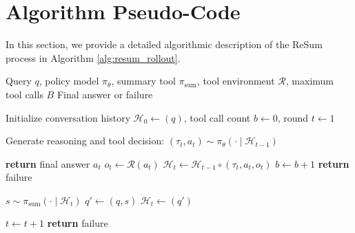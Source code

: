 \clearpage
\newpage
\section{Algorithm Pseudo-Code}

In this section, we provide a detailed algorithmic description of the ReSum process in Algorithm \ref{alg:resum_rollout}.

\renewcommand{\algorithmiccomment}[1]{\hfill $\triangleright$ {#1}}

\begin{algorithm}[h]
   \caption{\textbf{ReSum Rollout with Periodic Context Summarization}}
   \label{alg:resum_rollout}
\begin{algorithmic}[1]
    Query $q$, policy model $\pi_{\theta}$, summary tool $\pi_{\text{sum}}$, tool environment $\mathcal{R}$, maximum tool calls $B$
    Final answer or failure
   
   \STATE %
   \STATE Initialize conversation history $\mathcal{H}_0 \gets (q)$, tool call count $b \gets 0$, round $t \gets 1$
   
      \STATE Generate reasoning and tool decision:
      \STATE $(\tau_t, a_t) \sim \pi_{\theta}(\cdot \mid \mathcal{H}_{t-1})$ 
      
         \STATE \textbf{return} final answer $a_t$
         \STATE $o_t \gets \mathcal{R}(a_t)$ \COMMENT{\lightresponse{}}
         \STATE $\mathcal{H}_{t} \gets \mathcal{H}_{t-1} \circ (\tau_t, a_t, o_t)$
         \STATE $b \gets b+1$
      \ELSE
         \STATE \textbf{return} failure 
      \ENDIF
      
      \STATE %
         \STATE $s \sim \pi_{\text{sum}}(\cdot \mid \mathcal{H}_t)$ 
         \STATE $q' \gets (q, s)$
         \STATE $\mathcal{H}_t \gets (q')$ 
      \ENDIF

      \STATE $t \gets t+1$
   \ENDWHILE
   \STATE \textbf{return} failure 
\end{algorithmic}
\end{algorithm}